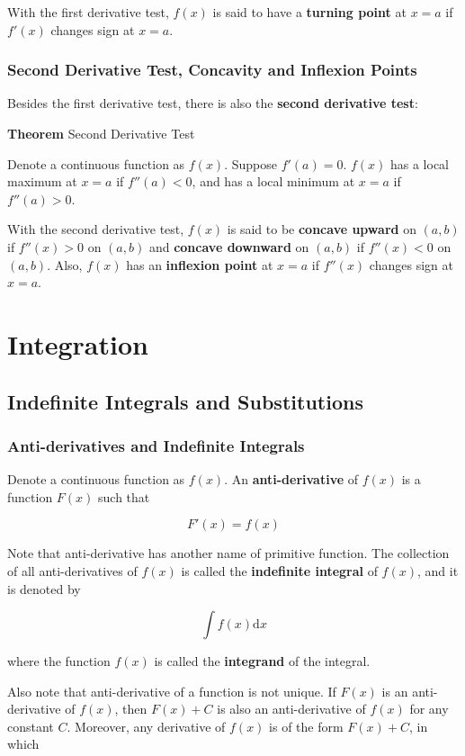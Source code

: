 \documentclass[a4paper,12pt]{article}
\newcommand{\s}{\vspace{1mm}}
\newcommand{\n}{\vspace{3mm}}
\newcommand{\diff}{\mathrm{d}}
\newenvironment{block}[4][Block]{ %
\begin{list}{}{
  \setlength{\leftmargin}{0mm}
  \setlength{\rightmargin}{0mm}
  \setlength{\topsep}{0mm}
  \setlength{\partopsep}{0mm}
  \parsep\parskip
  \setlength{\itemsep}{-\parsep}
  }
  \needspace{\baselineskip}
  \item \textbf{#2 #3} \hspace{1mm} #4
  \vspace{1mm}
  \item
  }
{
\end{list}
}
\begin{document}
With the first derivative test, $f(x)$ is said to have a \textbf{turning point} at $x=a$ if $f'(x)$ changes sign at $x=a$.

\subsubsection{Second Derivative Test, Concavity and Inflexion Points}
Besides the first derivative test, there is also the \textbf{second derivative test}:\n

\begin{block}{Theorem}{}{Second Derivative Test}
  Denote a continuous function as $f(x)$. Suppose $f'(a)=0$. $f(x)$ has a local maximum at $x=a$ if $f''(a)<0$, and has a local minimum at $x=a$ if $f''(a)>0$.
\end{block}\n

With the second derivative test, $f(x)$ is said to be \textbf{concave upward} on $(a,b)$ if $f''(x)>0$ on $(a,b)$ and \textbf{concave downward} on $(a,b)$ if $f''(x)<0$ on $(a,b)$. Also, $f(x)$ has an \textbf{inflexion point} at $x=a$ if $f''(x)$ changes sign at $x=a$.

\pagebreak

\section{Integration}
\subsection{Indefinite Integrals and Substitutions}
\subsubsection{Anti-derivatives and Indefinite Integrals}
Denote a continuous function as $f(x)$. An \textbf{anti-derivative} of $f(x)$ is a function $F(x)$ such that

$$F'(x)=f(x)$$\s

Note that anti-derivative has another name of primitive function. The collection of all anti-derivatives of $f(x)$ is called the \textbf{indefinite integral} of $f(x)$, and it is denoted by

$$\int f(x)\diff x$$\s

where the function $f(x)$ is called the \textbf{integrand} of the integral.\n

Also note that anti-derivative of a function is not unique. If $F(x)$ is an anti-derivative of $f(x)$, then $F(x)+C$ is also an anti-derivative of $f(x)$ for any constant $C$. Moreover, any derivative of $f(x)$ is of the form $F(x)+C$, in which
\end{document}
